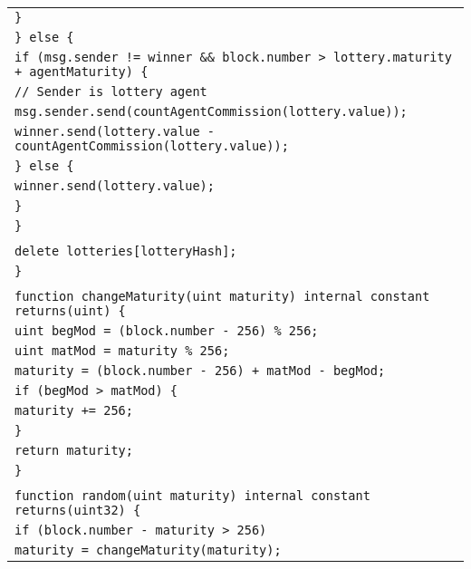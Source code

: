 \documentclass[a4paper]{article}
\begin{document}
\begin{tabularx}{\linewidth}{l}
        \qquad\qquad\qquad\texttt{\}}\\
        \qquad\qquad\texttt{\} else \{}\\
        \qquad\qquad\qquad\texttt{if (msg.sender != winner \&\& block.number > lottery.maturity + agentMaturity) \{}\\
        \qquad\qquad\qquad\qquad\texttt{// Sender is~lottery agent}\\
        \qquad\qquad\qquad\qquad\texttt{msg.sender.send(countAgentCommission(lottery.value));}\\
        \qquad\qquad\qquad\qquad\texttt{winner.send(lottery.value - countAgentCommission(lottery.value));}\\
        \qquad\qquad\qquad\texttt{\} else \{}\\
        \qquad\qquad\qquad\qquad\texttt{winner.send(lottery.value);}\\
        \qquad\qquad\qquad\texttt{\}}\\
        \qquad\qquad\texttt{\}}\\
        \\
        \qquad\qquad\texttt{delete lotteries[lotteryHash];}\\
        \qquad\texttt{\}}\\
        \\
        \qquad\texttt{function changeMaturity(uint maturity) internal constant returns(uint) \{}\\
        \qquad\qquad\texttt{uint begMod = (block.number - 256) \% 256;}\\
        \qquad\qquad\texttt{uint matMod = maturity \% 256;}\\
        \qquad\qquad\texttt{maturity = (block.number - 256) + matMod - begMod;}\\
        \qquad\qquad\texttt{if (begMod > matMod) \{}\\
        \qquad\qquad\qquad\texttt{maturity += 256;}\\
        \qquad\qquad\texttt{\}}\\
        \qquad\qquad\texttt{return maturity;}\\
        \qquad\texttt{\}}\\
        \\
        \qquad\texttt{function random(uint maturity) internal constant returns(uint32) \{}\\
        \qquad\qquad\texttt{if (block.number - maturity > 256)}\\
        \qquad\qquad\qquad\texttt{maturity = changeMaturity(maturity);}\\

\end{tabularx}
\end{document}
